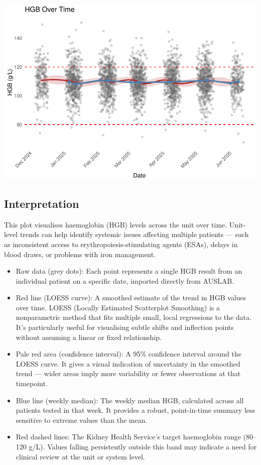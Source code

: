 \documentclass[
]{article}
\begin{document}
\includegraphics{DialysistrackR_files/figure-latex/plot_function_trend_tables-1.pdf}

\subsection{Interpretation}\label{interpretation}

This plot visualises haemoglobin (HGB) levels across the unit over time.
Unit-level trends can help identify systemic issues affecting multiple
patients --- such as inconsistent access to erythropoiesis-stimulating
agents (ESAs), delays in blood draws, or problems with iron management.

\begin{itemize}
\item
  Raw data (grey dots): Each point represents a single HGB result from
  an individual patient on a specific date, imported directly from
  AUSLAB.
\item
  Red line (LOESS curve): A smoothed estimate of the trend in HGB values
  over time. LOESS (Locally Estimated Scatterplot Smoothing) is a
  nonparametric method that fits multiple small, local regressions to
  the data. It's particularly useful for visualising subtle shifts and
  inflection points without assuming a linear or fixed relationship.
\item
  Pale red area (confidence interval): A 95\% confidence interval around
  the LOESS curve. It gives a visual indication of uncertainty in the
  smoothed trend --- wider areas imply more variability or fewer
  observations at that timepoint.
\item
  Blue line (weekly median): The weekly median HGB, calculated across
  all patients tested in that week. It provides a robust, point-in-time
  summary less sensitive to extreme values than the mean.
\item
  Red dashed lines: The Kidney Health Service's target haemoglobin range
  (80--120 g/L). Values falling persistently outside this band may
  indicate a need for clinical review at the unit or system level.
\end{itemize}
\end{document}

